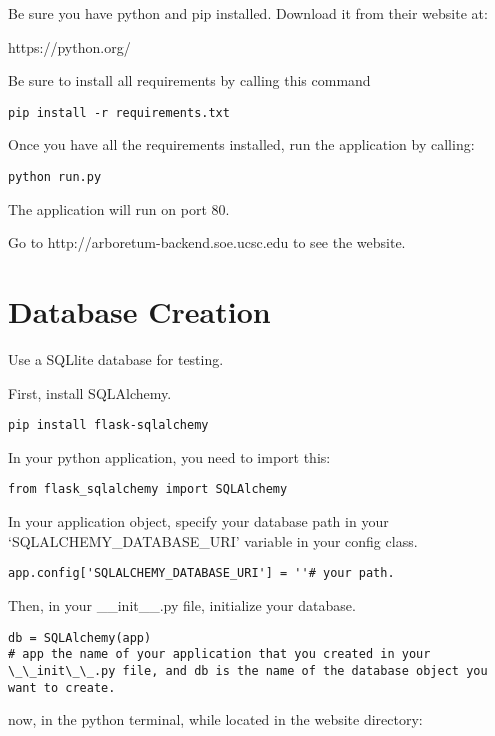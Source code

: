 Be sure you have python and pip installed. Download it from their
website at:

https://python.org/

Be sure to install all requirements by calling this command

\begin{verbatim}
pip install -r requirements.txt
\end{verbatim}

Once you have all the requirements installed, run the application by
calling:

\begin{verbatim}
python run.py
\end{verbatim}

The application will run on port 80.

Go to http://arboretum-backend.soe.ucsc.edu to see the website.

\section{Database Creation}\label{database-creation}

Use a SQLlite database for testing.

First, install SQLAlchemy.

\begin{verbatim}
pip install flask-sqlalchemy
\end{verbatim}

In your python application, you need to import this:

\begin{verbatim}
from flask_sqlalchemy import SQLAlchemy
\end{verbatim}

In your application object, specify your database path in your
`SQLALCHEMY\_DATABASE\_URI' variable in your config class.

\begin{verbatim}
app.config['SQLALCHEMY_DATABASE_URI'] = ''# your path.
\end{verbatim}

Then, in your \_\_init\_\_.py file, initialize your database.

\begin{verbatim}
db = SQLAlchemy(app) 
# app the name of your application that you created in your \_\_init\_\_.py file, and db is the name of the database object you want to create.
\end{verbatim}

now, in the python terminal, while located in the website directory:

